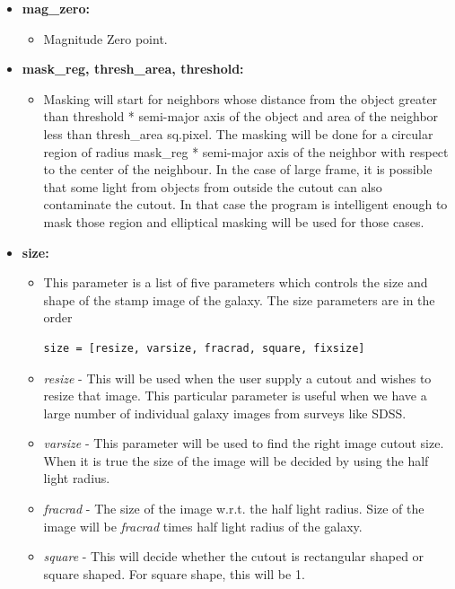 \documentclass[a4paper,12pt]{article}
\begin{document}
\begin{itemize}
\item \textbf{mag\_zero:}
\begin{itemize}
\item[] Magnitude Zero point.
\end{itemize}

\item \textbf{mask\_reg, thresh\_area, threshold:}
\begin{itemize}
\item[] Masking will start for neighbors whose distance from the object greater than threshold * semi-major axis of the object and area of the neighbor less than thresh\_area sq.pixel. The masking will be done for a circular region of radius mask\_reg * semi-major axis of the neighbor with respect to the center of the neighbour. In the case of large
 frame, it is possible that some light from objects from outside the cutout can also contaminate the cutout. In that case the program is intelligent enough to mask those region and elliptical masking will be used for those cases.
\end{itemize}

\item \textbf{size:}
\begin{itemize}
\item[] This parameter is a list of five parameters which controls the size and shape of the stamp image of the galaxy. The size parameters are in the order
\begin{verbatim}size = [resize, varsize, fracrad, square, fixsize]
\end{verbatim}

\item \textit{resize} - This will be used when the user supply a cutout and
 wishes to resize that image. This particular parameter is useful when
 we have a large number of individual galaxy images from surveys like
 SDSS.

\item \textit{varsize} - This parameter will be used to find the right image
 cutout size. When it is true the size of the image will be decided by
 using the half light radius.

\item \textit{fracrad} - The size of the image w.r.t. the half light radius.
 Size of the image will be\textit{ fracrad} times half light radius of the
 galaxy.

\item \textit{square} - This will decide whether the cutout is rectangular
 shaped or square shaped. For square shape, this will be 1.


\end{itemize}
\end{itemize}
\end{document}
